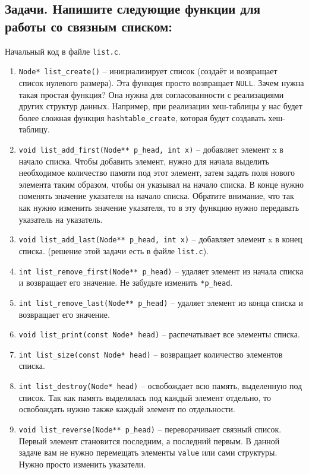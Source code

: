 \documentclass{article}
\begin{document}
\newpage
\subsection*{Задачи. Напишите следующие функции для работы со связным списком:}
Начальный код в файле \texttt{list.c}.
\begin{enumerate}
\item \texttt{Node* list\_create()} -- инициализирует список (создаёт и возвращает список нулевого размера). Эта функция просто возвращает \texttt{NULL}. Зачем нужна такая простая функция? Она нужна для согласованности с реализациями других структур данных. Например, при реализации хеш-таблицы у нас будет более сложная функция \texttt{hashtable\_create}, которая будет создавать хеш-таблицу.
\item \texttt{void list\_add\_first(Node** p\_head, int x)} -- добавляет элемент x в начало списка. Чтобы добавить элемент, нужно для начала выделить необходимое количество памяти под этот элемент, затем задать поля нового элемента таким образом, чтобы он указывал на начало списка. В конце нужно поменять значение указателя на начало списка. Обратите внимание, что так как нужно изменить значение указателя, то в эту функцию нужно передавать указатель на указатель.
\item \texttt{void list\_add\_last(Node** p\_head, int x)} -- добавляет элемент x в конец списка. (решение этой задачи есть в файле \texttt{list.c}).
\item \texttt{int list\_remove\_first(Node** p\_head)} -- удаляет элемент из начала списка и возвращает его значение. Не забудьте изменить \texttt{*p\_head}.
\item \texttt{int list\_remove\_last(Node** p\_head)} -- удаляет элемент из конца списка и возвращает его значение. 
\item \texttt{void list\_print(const Node* head)} -- распечатывает все элементы списка.
\item \texttt{int list\_size(const Node* head)} -- возвращает количество элементов списка.
\item \texttt{int list\_destroy(Node* head)} -- освобождает всю память, выделенную под список. Так как память выделялась под каждый элемент отдельно, то освобождать нужно также каждый элемент по отдельности.

\item \texttt{void list\_reverse(Node** p\_head)} -- переворачивает связный список. Первый элемент становится последним, а последний первым. В данной задаче вам не нужно перемещать элементы \texttt{value} или сами структуры. Нужно просто изменить указатели.


\end{enumerate}
\end{document}
